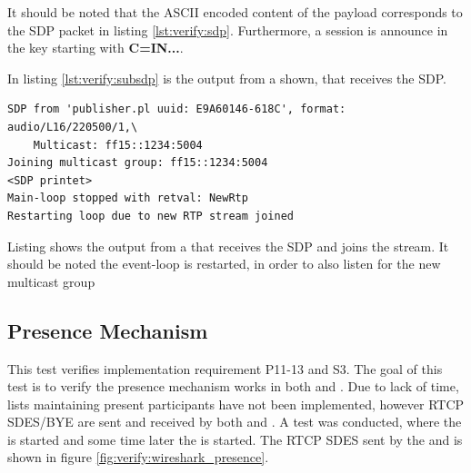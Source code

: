 It should be noted that the ASCII encoded content of the payload corresponds to the SDP packet in listing \ref{lst:verify:sdp}. Furthermore, a session is announce in the key starting with \textbf{C=IN...}.

In listing \ref{lst:verify:subsdp} is the output from a \sub{} shown, that receives the SDP.


\begin{listing}[h] 
\begin{verbatim}
SDP from 'publisher.pl uuid: E9A60146-618C', format: audio/L16/220500/1,\
	Multicast: ff15::1234:5004
Joining multicast group: ff15::1234:5004
<SDP printet>
Main-loop stopped with retval: NewRtp
Restarting loop due to new RTP stream joined
\end{verbatim}
\caption{Listing shows the output from a \sub{} that receives the SDP and joins the stream. It should be noted the event-loop is restarted, in order to also listen for the new multicast group}
\label{lst:verify:subsdp}
\end{listing}



\subsection{Presence Mechanism} \label{sec:verify:presencemechanism}
This test verifies implementation requirement P11-13 and S3. The goal of this test is to verify the presence mechanism works in both \sub{} and \pub{}. Due to lack of time, lists maintaining present participants have not been implemented, however RTCP SDES/BYE are sent and received by both \pub{} and \sub{}.
A test was conducted, where the \pub{} is started and some time later the \sub{} is started. The RTCP SDES sent by the \pub{} and \sub{} is shown in figure \ref{fig:verify:wireshark_presence}.

